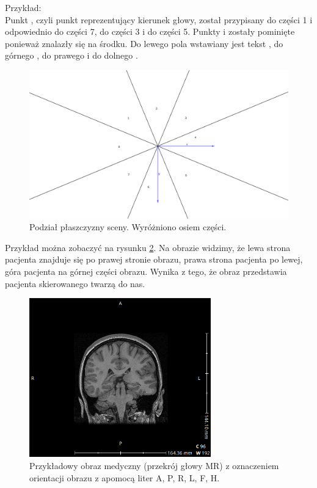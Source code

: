 \begin{itemize}
          Przykład:\\
          Punkt , czyli punkt reprezentujący kierunek głowy, został przypisany do części 1 i odpowiednio  do części 7,  do części 3 i  do części 5.
          Punkty  i  zostały pominięte ponieważ znalazły się na środku.
          Do lewego pola wstawiany jest tekst , do górnego , do prawego  i do dolnego .

          \begin{figure}[!htbp]
              \centering
              \includegraphics[width=\textwidth]{img/imageorientationindicator-004.png}
              \caption{Podział płaszczyzny sceny. Wyróżniono osiem części.}
              \label{fig:imageorientationindicator4}
          \end{figure}

          Przykład można zobaczyć na rysunku \ref{fig:imageorientationindicator1}.
          Na obrazie widzimy, że lewa strona pacjenta znajduje się po prawej stronie obrazu, prawa strona pacjenta po lewej, góra pacjenta na górnej części obrazu.
          Wynika z tego, że obraz przedstawia pacjenta skierowanego twarzą do nas.

          \begin{figure}[!htbp]
              \centering
              \includegraphics[width=0.7\textwidth]{img/imageorientationindicator-002.png}
              \caption{Przykładowy obraz medyczny (przekrój głowy MR) z oznaczeniem orientacji obrazu z apomocą liter A, P, R, L, F, H.}
              \label{fig:imageorientationindicator1}
          \end{figure}


\end{itemize}
